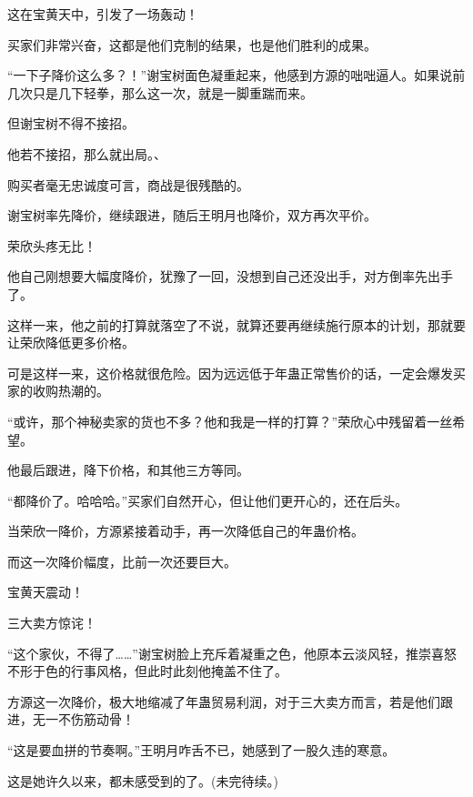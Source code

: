 \begin{this_body}
这在宝黄天中，引发了一场轰动！

买家们非常兴奋，这都是他们克制的结果，也是他们胜利的成果。

“一下子降价这么多？！”谢宝树面色凝重起来，他感到方源的咄咄逼人。如果说前几次只是几下轻拳，那么这一次，就是一脚重踹而来。

但谢宝树不得不接招。

他若不接招，那么就出局。、

购买者毫无忠诚度可言，商战是很残酷的。

谢宝树率先降价，继续跟进，随后王明月也降价，双方再次平价。

荣欣头疼无比！

他自己刚想要大幅度降价，犹豫了一回，没想到自己还没出手，对方倒率先出手了。

这样一来，他之前的打算就落空了不说，就算还要再继续施行原本的计划，那就要让荣欣降低更多价格。

可是这样一来，这价格就很危险。因为远远低于年蛊正常售价的话，一定会爆发买家的收购热潮的。

“或许，那个神秘卖家的货也不多？他和我是一样的打算？”荣欣心中残留着一丝希望。

他最后跟进，降下价格，和其他三方等同。

“都降价了。哈哈哈。”买家们自然开心，但让他们更开心的，还在后头。

当荣欣一降价，方源紧接着动手，再一次降低自己的年蛊价格。

而这一次降价幅度，比前一次还要巨大。

宝黄天震动！

三大卖方惊诧！

“这个家伙，不得了……”谢宝树脸上充斥着凝重之色，他原本云淡风轻，推崇喜怒不形于色的行事风格，但此时此刻他掩盖不住了。

方源这一次降价，极大地缩减了年蛊贸易利润，对于三大卖方而言，若是他们跟进，无一不伤筋动骨！

“这是要血拼的节奏啊。”王明月咋舌不已，她感到了一股久违的寒意。

这是她许久以来，都未感受到的了。(未完待续。)

\end{this_body}

